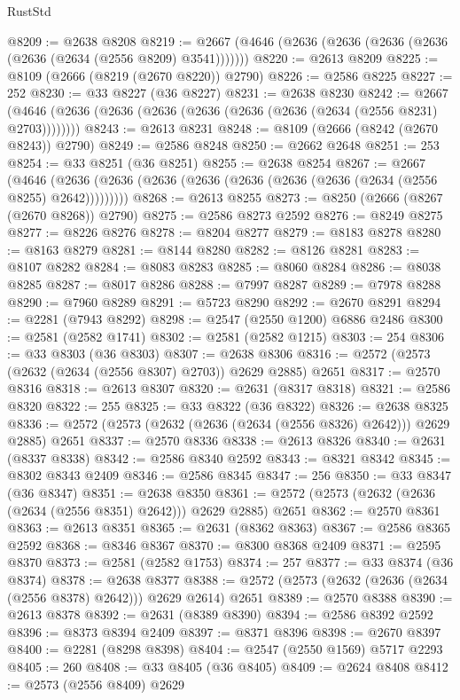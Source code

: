 \begin{lexlean}{RustStd}
\begin{coremodule}
@8209 := @2638 @8208
@8219 := @2667 (@4646 (@2636 (@2636 (@2636 (@2636 (@2636 (@2634 (@2556 @8209) @3541)))))))
@8220 := @2613 @8209
@8225 := @8109 (@2666 (@8219 (@2670 @8220)) @2790)
@8226 := @2586 @8225
@8227 := 252
@8230 := @33 @8227 (@36 @8227)
@8231 := @2638 @8230
@8242 := @2667 (@4646 (@2636 (@2636 (@2636 (@2636 (@2636 (@2636 (@2634 (@2556 @8231) @2703))))))))
@8243 := @2613 @8231
@8248 := @8109 (@2666 (@8242 (@2670 @8243)) @2790)
@8249 := @2586 @8248
@8250 := @2662 @2648
@8251 := 253
@8254 := @33 @8251 (@36 @8251)
@8255 := @2638 @8254
@8267 := @2667
    (@4646 (@2636 (@2636 (@2636 (@2636 (@2636 (@2636 (@2636 (@2634 (@2556 @8255) @2642)))))))))
@8268 := @2613 @8255
@8273 := @8250 (@2666 (@8267 (@2670 @8268)) @2790)
@8275 := @2586 @8273 @2592
@8276 := @8249 @8275
@8277 := @8226 @8276
@8278 := @8204 @8277
@8279 := @8183 @8278
@8280 := @8163 @8279
@8281 := @8144 @8280
@8282 := @8126 @8281
@8283 := @8107 @8282
@8284 := @8083 @8283
@8285 := @8060 @8284
@8286 := @8038 @8285
@8287 := @8017 @8286
@8288 := @7997 @8287
@8289 := @7978 @8288
@8290 := @7960 @8289
@8291 := @5723 @8290
@8292 := @2670 @8291
@8294 := @2281 (@7943 @8292)
@8298 := @2547 (@2550 @1200) @6886 @2486
@8300 := @2581 (@2582 @1741)
@8302 := @2581 (@2582 @1215)
@8303 := 254
@8306 := @33 @8303 (@36 @8303)
@8307 := @2638 @8306
@8316 := @2572 (@2573 (@2632 (@2634 (@2556 @8307) @2703)) @2629 @2885) @2651
@8317 := @2570 @8316
@8318 := @2613 @8307
@8320 := @2631 (@8317 @8318)
@8321 := @2586 @8320
@8322 := 255
@8325 := @33 @8322 (@36 @8322)
@8326 := @2638 @8325
@8336 := @2572 (@2573 (@2632 (@2636 (@2634 (@2556 @8326) @2642))) @2629 @2885) @2651
@8337 := @2570 @8336
@8338 := @2613 @8326
@8340 := @2631 (@8337 @8338)
@8342 := @2586 @8340 @2592
@8343 := @8321 @8342
@8345 := @8302 @8343 @2409
@8346 := @2586 @8345
@8347 := 256
@8350 := @33 @8347 (@36 @8347)
@8351 := @2638 @8350
@8361 := @2572 (@2573 (@2632 (@2636 (@2634 (@2556 @8351) @2642))) @2629 @2885) @2651
@8362 := @2570 @8361
@8363 := @2613 @8351
@8365 := @2631 (@8362 @8363)
@8367 := @2586 @8365 @2592
@8368 := @8346 @8367
@8370 := @8300 @8368 @2409
@8371 := @2595 @8370
@8373 := @2581 (@2582 @1753)
@8374 := 257
@8377 := @33 @8374 (@36 @8374)
@8378 := @2638 @8377
@8388 := @2572 (@2573 (@2632 (@2636 (@2634 (@2556 @8378) @2642))) @2629 @2614) @2651
@8389 := @2570 @8388
@8390 := @2613 @8378
@8392 := @2631 (@8389 @8390)
@8394 := @2586 @8392 @2592
@8396 := @8373 @8394 @2409
@8397 := @8371 @8396
@8398 := @2670 @8397
@8400 := @2281 (@8298 @8398)
@8404 := @2547 (@2550 @1569) @5717 @2293
@8405 := 260
@8408 := @33 @8405 (@36 @8405)
@8409 := @2624 @8408
@8412 := @2573 (@2556 @8409) @2629

\end{coremodule}
\end{lexlean}
